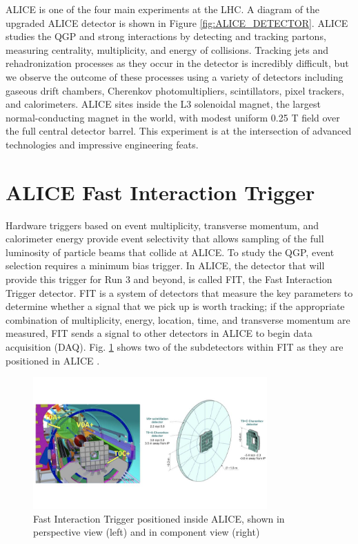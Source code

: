 ALICE is one of the four main experiments at the LHC. A diagram of the upgraded ALICE detector is shown in Figure \ref{fig:ALICE_DETECTOR}\cite{ALICE_Schematic}. ALICE studies the QGP and strong interactions by detecting and tracking partons, measuring centrality, multiplicity, and energy of collisions. Tracking jets and rehadronization processes as they occur in the detector is incredibly difficult, but we observe the outcome of these processes using a variety of detectors including gaseous drift chambers, Cherenkov photomultipliers, scintillators, pixel trackers, and calorimeters. ALICE sites inside the L3 solenoidal magnet, the largest normal-conducting magnet in the world, with modest uniform 0.25 T field over the full central detector barrel.  This experiment is at the intersection of advanced technologies and impressive engineering feats. 


\section{ALICE Fast Interaction Trigger}
Hardware triggers based on event multiplicity, transverse momentum, and calorimeter energy provide
event selectivity that allows sampling of the full luminosity of particle beams that collide at ALICE. To study the QGP, event selection requires a minimum bias trigger. In ALICE, the detector that will provide this trigger for Run 3 and beyond, is called FIT, the Fast Interaction Trigger detector. FIT is a system of detectors that measure the key parameters to determine whether a signal that we pick up is worth tracking; if the appropriate combination of multiplicity, energy, location, time, and transverse momentum are measured, FIT sends a signal to other detectors in ALICE to begin data acquisition (DAQ). Fig. \ref{fig:FIT_IN_ALICE} shows two of the subdetectors within FIT as they are positioned in ALICE \cite{FIT_IN_ALICE}. 

\begin{figure}[H]
    \centering
    \includegraphics[width=0.8\textwidth]{figures/ALICE/FIT_in_ALICE.jpg}
    \caption{Fast Interaction Trigger positioned inside ALICE, shown in perspective view (left) and in component view (right) \cite{FIT_IN_ALICE}}
    \label{fig:FIT_IN_ALICE}
\end{figure}


